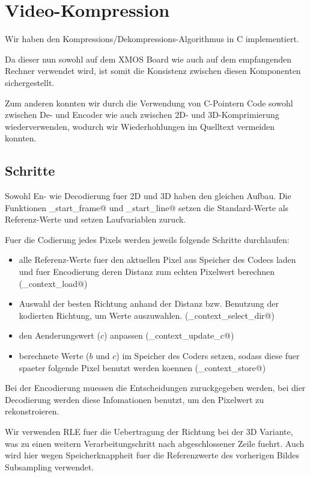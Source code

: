 \section{Video-Kompression}

Wir haben den Kompressions/Dekompressions-Algorithmus in C implementiert.

Da dieser nun sowohl auf dem XMOS Board wie auch auf dem empfangenden Rechner 
verwendet wird, ist somit die Konsistenz zwischen diesen Komponenten sichergestellt.

Zum anderen konnten wir durch die Verwendung von C-Pointern Code sowohl zwischen 
De- und Encoder wie auch zwischen 2D- und 3D-Komprimierung wiederverwenden,
wodurch wir Wiederhohlungen im Quelltext vermeiden konnten.

\subsection{Schritte}
Sowohl En- wie Decodierung fuer 2D und 3D haben den gleichen Aufbau.
Die Funktionen \lstinline@cmpr_start_frame@ und \lstinline@cmpr_start_line@
setzen die Standard-Werte als Referenz-Werte und setzen Laufvariablen zuruck.

Fuer die Codierung jedes Pixels werden jeweils folgende Schritte durchlaufen:
\begin{itemize}
\item alle Referenz-Werte fuer den aktuellen Pixel aus Speicher des Codecs laden 
      und fuer Encodierung deren Distanz zum echten Pixelwert berechnen
	(\lstinline@cmpr_context_load@)
\item Auswahl der besten Richtung anhand der Distanz bzw. Benutzung
      der kodierten Richtung, um Werte auszuwahlen.
	(\lstinline@cmpr_context_select_dir@)
\item den Aenderungswert ($c$) anpassen
	(\lstinline@cmpr_context_update_c@)
\item berechnete Werte ($b$ und $c$) im Speicher des Coders setzen, sodass diese 
      fuer spaeter folgende Pixel benutzt werden koennen
	(\lstinline@cmpr_context_store@)
\end{itemize}

Bei der Encodierung muessen die Entscheidungen zuruckgegeben werden,
bei dier Decodierung werden diese Infomationen benutzt, um den Pixelwert zu 
rekonstroieren. 

Wir verwenden RLE fuer die Uebertragung der Richtung bei der 3D Variante,
was zu einen weitern Verarbeitungschritt nach abgeschlossener Zeile fuehrt.
Auch wird hier wegen Speicherknappheit fuer die Referenzwerte des vorherigen Bildes
Subsampling verwendet.

